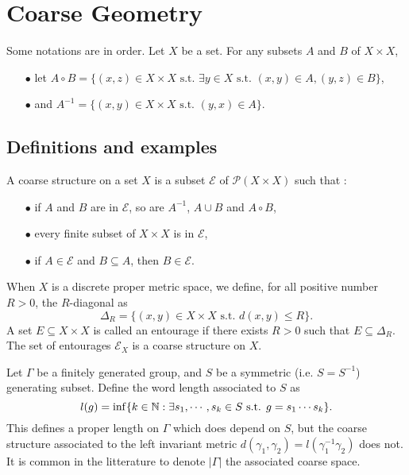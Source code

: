 \section{Coarse Geometry}

Some notations are in order. Let $X$ be a set. For any subsets $A$ and $B$ of $X\times X$, 
\begin{itemize}
\item[$\bullet$] let $A\circ B = \{(x,z)\in X\times X \text{ s.t. } \exists y\in X\text{ s.t. } (x,y)\in A, (y,z)\in B\}$,
\item[$\bullet$] and $A^{-1} = \{(x,y)\in X\times X \text{ s.t. } (y,x)\in A\}$.
\end{itemize}

\subsection{Definitions and examples}

\begin{definition}\cite{RoeCoarse}
A coarse structure on a set $X$ is a subset $\mathcal E$ of $\mathcal P(X\times X)$ such that :
\begin{itemize}
\item[$\bullet$] if $A$ and $B$ are in $\mathcal E$, so are $A^{-1}$, $A\cup B$ and $A\circ B$,
\item[$\bullet$] every finite subset of $X\times X$ is in $\mathcal E$,
\item[$\bullet$] if $A\in\mathcal E$ and $B\subseteq A$, then $B\in \mathcal E$.
\end{itemize}
\end{definition} 

\begin{Expl}
When $X$ is a discrete proper metric space, we define, for all positive number $R>0$, the $R$-diagonal as 
\[\Delta_R= \{(x,y)\in X\times X \text{ s.t. } d(x,y)\leq R\}.\]
A set $E\subseteq X\times X$ is called an entourage if there exists $R>0$ such that $E\subseteq \Delta_R$. The set of entourages $\mathcal E_X$ is a coarse structure on $X$.
\end{Expl}

\begin{Expl} Let $\Gamma$ be a finitely generated group, and $S$ be a symmetric (i.e. $S=S^{-1}$) generating subset. Define the word length associated to $S$ as 
\[l(g) = \inf\{ k\in \mathbb N : \exists s_1,\cdots,s_k\in S \text{ s.t. } g= s_1 \cdots s_k\}.\]
This defines a proper length on $\Gamma$ which does depend on $S$, but the coarse structure associated to the left invariant metric $d(\gamma_1,\gamma_2)= l(\gamma_1^{-1}\gamma_2)$ does not. It is common in the litterature to denote $|\Gamma|$ the  associated coarse space.
\end{Expl}

